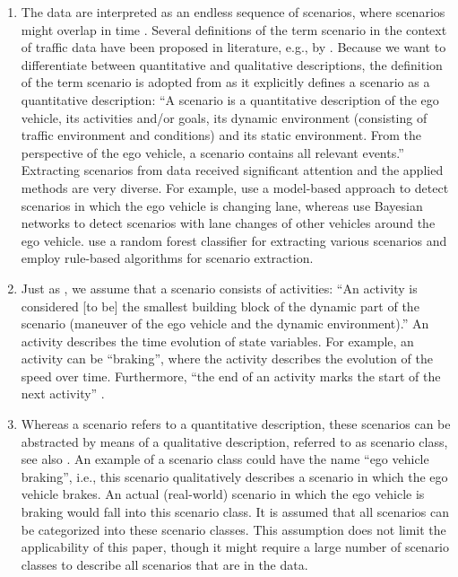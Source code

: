 \begin{enumerate}
	\item The data are interpreted as an endless sequence of scenarios, where scenarios might overlap in time \cite{elrofai2018scenario}. Several definitions of the term scenario in the context of traffic data have been proposed in literature, e.g., by \textcite{geyer2014, ulbrich2015, elrofai2016scenario, elrofai2018scenario}. Because we want to differentiate between quantitative and qualitative descriptions, the definition of the term scenario is adopted from \textcite{elrofai2018scenario} as it explicitly defines a scenario as a quantitative description: ``A scenario is a quantitative description of the ego vehicle, its activities and/or goals, its dynamic environment (consisting of traffic environment and conditions) and its static environment. From the perspective of the ego vehicle, a scenario contains all relevant events.'' Extracting scenarios from data received significant attention and the applied methods are very diverse. For example, \textcite{elrofai2016scenario} use a model-based approach to detect scenarios in which the ego vehicle is changing lane, whereas \textcite{kasper2012oobayesnetworks} use Bayesian networks to detect scenarios with lane changes of other vehicles around the ego vehicle. \textcite{xie2017driving} use a random forest classifier for extracting various scenarios and \textcite{paardekooper2019dataset3000km} employ rule-based algorithms for scenario extraction.
	
	\item Just as \textcite{elrofai2018scenario}, we assume that a scenario consists of activities: ``An activity is considered [to be] the smallest building block of the dynamic part of the scenario (maneuver of the ego vehicle and the dynamic environment).'' An activity describes the time evolution of state variables. For example, an activity can be ``braking'', where the activity describes the evolution of the speed over time. Furthermore, ``the end of an activity marks the start of the next activity'' \cite{elrofai2018scenario}.
	
	\item Whereas a scenario refers to a quantitative description, these scenarios can be abstracted by means of a qualitative description, referred to as scenario class, see also \textcite{ploeg2018cetran, elrofai2018scenario}. An example of a scenario class could have the name ``ego vehicle braking'', i.e., this scenario qualitatively describes a scenario in which the ego vehicle brakes. An actual (real-world) scenario in which the ego vehicle is braking would fall into this scenario class. It is assumed that all scenarios can be categorized into these scenario classes. This assumption does not limit the applicability of this paper, though it might require a large number of scenario classes to describe all scenarios that are in the data.
	

\end{enumerate}
